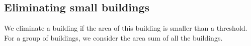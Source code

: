 \subsection{Eliminating small buildings}
\label{sec:Eliminate}
We eliminate a building if the area of this building is smaller than a 
threshold.
For a group of buildings, we consider the area sum of all the buildings.


%
%
%
%
%
%
%
%
%
%







